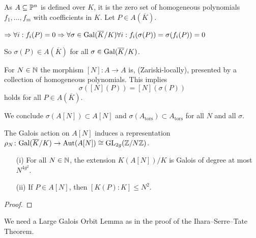 \documentclass{beamer}
\begin{document}
\begin{frame}
  As $A\subseteq{\mathbb{P}}^n$ is defined over $K$, it is the zero set 
  of  homogeneous polynomials $f_1,\ldots,f_m$ with
  coefficients in $K$. Let $P\in A(\overline K)$. 

  $\Rightarrow \forall i: f_i(P) = 0 
  \Rightarrow \forall \sigma\in\mathrm{Gal}(\overline{K}/K) \forall i: f_i(\sigma(P))=\sigma(f_i(P))=0$

  So $\sigma(P) \in A(\overline K)$ for all $\sigma\in \mathrm{Gal}(\overline{K}/K)$. 

  For $N\in{\mathbb{N}}$ the morphism
  $[N]\colon A\rightarrow A$ is, (Zariski-locally), presented
  by a collection of homogeneous polynomials. This implies
  $$\sigma([N](P)) = 
  [N](\sigma(P))$$
  holds for {all} $P\in A(\overline K)$.

  We conclude 
  $\sigma(A[N])\subset A[N]$ and
  $\sigma(A_{\mathrm{tors}}) \subset A_{\mathrm{tors}}$ for all $N$
  and all $\sigma$. 

  \begin{definition}
    The Galois action on $A[N]$ induces a representation
    $\rho_N \colon \mathrm{Gal}(\overline{K}/K)\rightarrow\mathrm{Aut}(A[N]) \cong
    \mathrm{GL}_{2g}({\mathbb{Z}}/N{\mathbb{Z}})$.
  \end{definition}
\end{frame}
\begin{frame}
  
  \begin{lemma}
    \begin{enumerate}
    \item[(i)]
      For all $N\in{\mathbb{N}}$, the extension  $K(A[N])/K$ is Galois
      of degree at most $N^{4g^2}$.
    \item[(ii)] If $P\in A[N]$, then $[K(P):K]\le N^2$.
    \end{enumerate}
  \end{lemma}
  \begin{proof}
    \vspace{3cm}
  \end{proof}

  We need a \alert{Large Galois Orbit Lemma} as in the proof of the
  Ihara--Serre--Tate Theorem. 
\end{frame}
\end{document}
